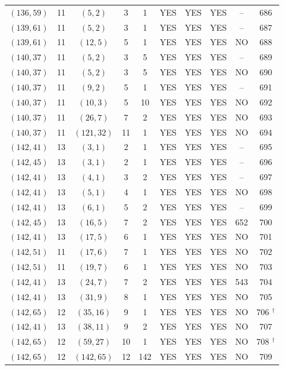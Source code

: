 \begin{longtable}{|c|c|c|c|c|c|c|c|c|c|}
$(136, 59)$ & 11 & $(5, 2)$ & 3 & 1 & YES & YES & YES & -- & 686\\
$(139, 61)$ & 11 & $(5, 2)$ & 3 & 1 & YES & YES & YES & -- & 687\\
$(139, 61)$ & 11 & $(12, 5)$ & 5 & 1 & YES & YES & YES & NO & 688\\
$(140, 37)$ & 11 & $(5, 2)$ & 3 & 5 & YES & YES & YES & -- & 689\\
$(140, 37)$ & 11 & $(5, 2)$ & 3 & 5 & YES & YES & YES & NO & 690\\
$(140, 37)$ & 11 & $(9, 2)$ & 5 & 1 & YES & YES & YES & -- & 691\\
$(140, 37)$ & 11 & $(10, 3)$ & 5 & 10 & YES & YES & YES & NO & 692\\
$(140, 37)$ & 11 & $(26, 7)$ & 7 & 2 & YES & YES & YES & NO & 693\\
$(140, 37)$ & 11 & $(121, 32)$ & 11 & 1 & YES & YES & YES & NO & 694\\
$(142, 41)$ & 13 & $(3, 1)$ & 2 & 1 & YES & YES & YES & -- & 695\\
$(142, 45)$ & 13 & $(3, 1)$ & 2 & 1 & YES & YES & YES & -- & 696\\
$(142, 41)$ & 13 & $(4, 1)$ & 3 & 2 & YES & YES & YES & -- & 697\\
$(142, 41)$ & 13 & $(5, 1)$ & 4 & 1 & YES & YES & YES & NO & 698\\
$(142, 41)$ & 13 & $(6, 1)$ & 5 & 2 & YES & YES & YES & -- & 699\\
$(142, 45)$ & 13 & $(16, 5)$ & 7 & 2 & YES & YES & YES & 652 & 700\\
$(142, 41)$ & 13 & $(17, 5)$ & 6 & 1 & YES & YES & YES & NO & 701\\
$(142, 51)$ & 11 & $(17, 6)$ & 7 & 1 & YES & YES & YES & NO & 702\\
$(142, 51)$ & 11 & $(19, 7)$ & 6 & 1 & YES & YES & YES & NO & 703\\
$(142, 41)$ & 13 & $(24, 7)$ & 7 & 2 & YES & YES & YES & 543 & 704\\
$(142, 41)$ & 13 & $(31, 9)$ & 8 & 1 & YES & YES & YES & NO & 705\\
$(142, 65)$ & 12 & $(35, 16)$ & 9 & 1 & YES & YES & YES & NO & 706 ${}^\dagger$\\
$(142, 41)$ & 13 & $(38, 11)$ & 9 & 2 & YES & YES & YES & NO & 707\\
$(142, 65)$ & 12 & $(59, 27)$ & 10 & 1 & YES & YES & YES & NO & 708 ${}^\dagger$\\
$(142, 65)$ & 12 & $(142, 65)$ & 12 & 142 & YES & YES & YES & NO & 709\\

\end{longtable}
